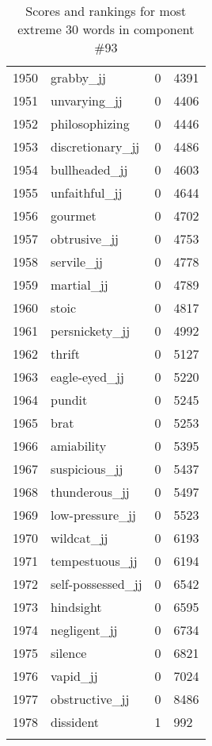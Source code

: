 \begin{longtable}[!htbp]{| rlr@{.}l |}
    1950 & grabby\_jj & 0 & 4391 \\
    1951 & unvarying\_jj & 0 & 4406 \\
    1952 & philosophizing & 0 & 4446 \\
    1953 & discretionary\_jj & 0 & 4486 \\
    1954 & bullheaded\_jj & 0 & 4603 \\
    1955 & unfaithful\_jj & 0 & 4644 \\
    1956 & gourmet & 0 & 4702 \\
    1957 & obtrusive\_jj & 0 & 4753 \\
    1958 & servile\_jj & 0 & 4778 \\
    1959 & martial\_jj & 0 & 4789 \\
    1960 & stoic & 0 & 4817 \\
    1961 & persnickety\_jj & 0 & 4992 \\
    1962 & thrift & 0 & 5127 \\
    1963 & eagle-eyed\_jj & 0 & 5220 \\
    1964 & pundit & 0 & 5245 \\
    1965 & brat & 0 & 5253 \\
    1966 & amiability & 0 & 5395 \\
    1967 & suspicious\_jj & 0 & 5437 \\
    1968 & thunderous\_jj & 0 & 5497 \\
    1969 & low-pressure\_jj & 0 & 5523 \\
    1970 & wildcat\_jj & 0 & 6193 \\
    1971 & tempestuous\_jj & 0 & 6194 \\
    1972 & self-possessed\_jj & 0 & 6542 \\
    1973 & hindsight & 0 & 6595 \\
    1974 & negligent\_jj & 0 & 6734 \\
    1975 & silence & 0 & 6821 \\
    1976 & vapid\_jj & 0 & 7024 \\
    1977 & obstructive\_jj & 0 & 8486 \\
    1978 & dissident & 1 & 992 \\
    \hline
    \caption{Scores and rankings for most extreme 30 words in component \#93} \\
\end{longtable}
